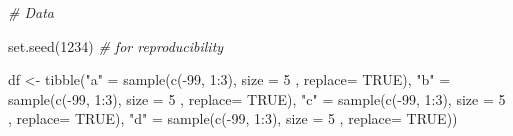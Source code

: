 \documentclass[
]{book}
\newenvironment{Shaded}{\begin{snugshade}}{\end{snugshade}}
\newcommand{\AttributeTok}[1]{\textcolor[rgb]{0.77,0.63,0.00}{#1}}
\newcommand{\CommentTok}[1]{\textcolor[rgb]{0.56,0.35,0.01}{\textit{#1}}}
\newcommand{\ConstantTok}[1]{\textcolor[rgb]{0.00,0.00,0.00}{#1}}
\newcommand{\DecValTok}[1]{\textcolor[rgb]{0.00,0.00,0.81}{#1}}
\newcommand{\FunctionTok}[1]{\textcolor[rgb]{0.00,0.00,0.00}{#1}}
\newcommand{\NormalTok}[1]{#1}
\newcommand{\OtherTok}[1]{\textcolor[rgb]{0.56,0.35,0.01}{#1}}
\newcommand{\SpecialCharTok}[1]{\textcolor[rgb]{0.00,0.00,0.00}{#1}}
\newcommand{\StringTok}[1]{\textcolor[rgb]{0.31,0.60,0.02}{#1}}
\begin{document}
\begin{Shaded}
\begin{Highlighting}[]
\CommentTok{\# Data}

\FunctionTok{set.seed}\NormalTok{(}\DecValTok{1234}\NormalTok{) }\CommentTok{\# for reproducibility }

\NormalTok{df }\OtherTok{\textless{}{-}} \FunctionTok{tibble}\NormalTok{(}\StringTok{"a"} \OtherTok{=} \FunctionTok{sample}\NormalTok{(}\FunctionTok{c}\NormalTok{(}\SpecialCharTok{{-}}\DecValTok{99}\NormalTok{, }\DecValTok{1}\SpecialCharTok{:}\DecValTok{3}\NormalTok{), }\AttributeTok{size =} \DecValTok{5}\NormalTok{ , }\AttributeTok{replace=} \ConstantTok{TRUE}\NormalTok{),}
             \StringTok{"b"} \OtherTok{=} \FunctionTok{sample}\NormalTok{(}\FunctionTok{c}\NormalTok{(}\SpecialCharTok{{-}}\DecValTok{99}\NormalTok{, }\DecValTok{1}\SpecialCharTok{:}\DecValTok{3}\NormalTok{), }\AttributeTok{size =} \DecValTok{5}\NormalTok{ , }\AttributeTok{replace=} \ConstantTok{TRUE}\NormalTok{),}
             \StringTok{"c"} \OtherTok{=} \FunctionTok{sample}\NormalTok{(}\FunctionTok{c}\NormalTok{(}\SpecialCharTok{{-}}\DecValTok{99}\NormalTok{, }\DecValTok{1}\SpecialCharTok{:}\DecValTok{3}\NormalTok{), }\AttributeTok{size =} \DecValTok{5}\NormalTok{ , }\AttributeTok{replace=} \ConstantTok{TRUE}\NormalTok{),}
             \StringTok{"d"} \OtherTok{=} \FunctionTok{sample}\NormalTok{(}\FunctionTok{c}\NormalTok{(}\SpecialCharTok{{-}}\DecValTok{99}\NormalTok{, }\DecValTok{1}\SpecialCharTok{:}\DecValTok{3}\NormalTok{), }\AttributeTok{size =} \DecValTok{5}\NormalTok{ , }\AttributeTok{replace=} \ConstantTok{TRUE}\NormalTok{))}
\end{Highlighting}
\end{Shaded}

\begin{Shaded}
\end{Shaded}
\end{document}
